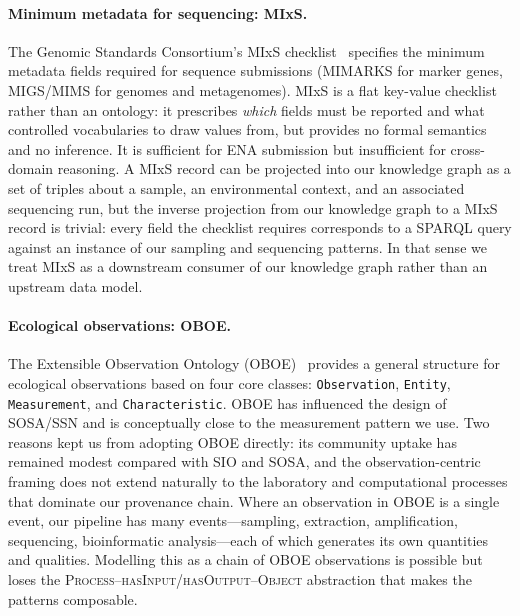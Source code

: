 \documentclass[11pt,a4paper]{article}
\begin{document}
\paragraph{Minimum metadata for sequencing: MIxS.}
The Genomic Standards Consortium's MIxS checklist~\cite{mixs}
specifies the minimum metadata fields required for sequence
submissions (MIMARKS for marker genes, MIGS/MIMS for genomes and
metagenomes). MIxS is a flat key-value checklist rather than an
ontology: it prescribes \emph{which} fields must be reported and
what controlled vocabularies to draw values from, but provides no
formal semantics and no inference. It is sufficient for ENA
submission but insufficient for cross-domain reasoning. A MIxS
record can be projected into our knowledge graph as a set of
triples about a sample, an environmental context, and an
associated sequencing run, but the inverse projection from our
knowledge graph to a MIxS record is trivial: every field the
checklist requires corresponds to a SPARQL query against an instance
of our sampling and sequencing patterns. In that sense we treat
MIxS as a downstream consumer of our knowledge graph rather than an
upstream data model.

\paragraph{Ecological observations: OBOE.}
The Extensible Observation Ontology (OBOE)~\cite{oboe} provides a
general structure for ecological observations based on four core
classes: \texttt{Observation}, \texttt{Entity}, \texttt{Measurement},
and \texttt{Characteristic}. OBOE has influenced the design of
SOSA/SSN and is conceptually close to the measurement pattern we
use. Two reasons kept us from adopting OBOE directly: its
community uptake has remained modest compared with SIO and SOSA,
and the observation-centric framing does not extend naturally to
the laboratory and computational processes that dominate our
provenance chain. Where an observation in OBOE is a single event,
our pipeline has many events---sampling, extraction, amplification,
sequencing, bioinformatic analysis---each of which generates its
own quantities and qualities. Modelling this as a chain of OBOE
observations is possible but loses the
\textsc{Process--hasInput/hasOutput--Object} abstraction that makes
the patterns composable.
\end{document}
